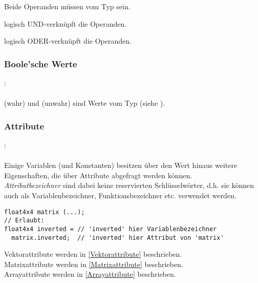 
Beide Operanden müssen vom Typ  sein.

\op{\&\&} logisch UND-verknüpft die Operanden.

\op{||} logisch ODER-verknüpft die Operanden.


\subsubsection{Boole'sche Werte}\label{Boole'sche Werte}
:\label{asdr_konst_bool}\\
\hspace*{1cm}\\

 (wahr) und  (unwahr) sind Werte vom Typ  (siehe ).


\subsubsection{Attribute}\label{Attribute}
:\label{attribut}\\
\hspace*{1cm}\\


Einige Variablen (und Konstanten) besitzen über den Wert hinaus weitere Eigenschaften, die
über Attribute abgefragt werden können. \\
\emph{Attributbezeichner} sind dabei keine reservierten
Schlüsselwörter, d.h. sie können auch als Variablenbezeichner, Funktionsbezeichner etc.
verwendet werden.

\begin{lstlisting}
float4x4 matrix (...);
// Erlaubt:
float4x4 inverted = // 'inverted' hier Variablenbezeichner
  matrix.inverted;  // 'inverted' hier Attribut von 'matrix'
\end{lstlisting}

\noindent Vektorattribute werden in \ref{Vektorattribute} beschrieben.\\
Matrixattribute werden in \ref{Matrixattribute} beschrieben.\\
Arrayattribute werden in \ref{Arrayattribute} beschrieben.\\



